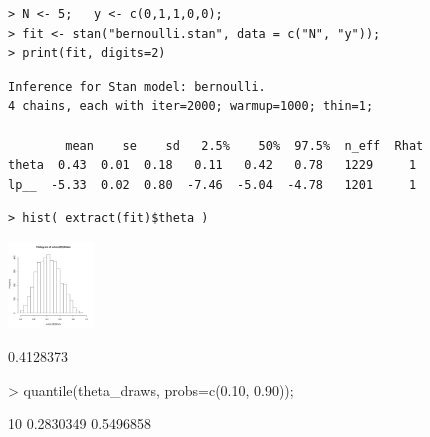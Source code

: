 \documentclass[10pt]{report}
\begin{document}
%
\begin{minipage}[t]{\textwidth}
\footnotesize
\begin{Verbatim}
> N <- 5;   y <- c(0,1,1,0,0);
> fit <- stan("bernoulli.stan", data = c("N", "y"));
> print(fit, digits=2)
\end{Verbatim}
%
\vspace*{1pt}
%
\begin{Verbatim}[fontshape=sl]
Inference for Stan model: bernoulli.
4 chains, each with iter=2000; warmup=1000; thin=1; 

        mean    se    sd   2.5%    50%  97.5%  n_eff  Rhat
theta  0.43  0.01  0.18   0.11   0.42   0.78   1229     1
lp__  -5.33  0.02  0.80  -7.46  -5.04  -4.78   1201     1
\end{Verbatim}
%
\vspace*{3pt}
%
\begin{Verbatim}
> hist( extract(fit)$theta )
\end{Verbatim}
\vspace*{-24pt}
\hfill\includegraphics[height=0.9in]{img/bernoulli-posterior-histo.pdf}
\hspace*{24pt}
\end{minipage}


%
\begin{codeout}
[1] 0.4128373
\end{codeout}
%
\begin{codein}
> quantile(theta_draws, probs=c(0.10, 0.90));
\end{codein}
\begin{codeout}
      10%
0.2830349 0.5496858
\end{codeout}
\end{document}

